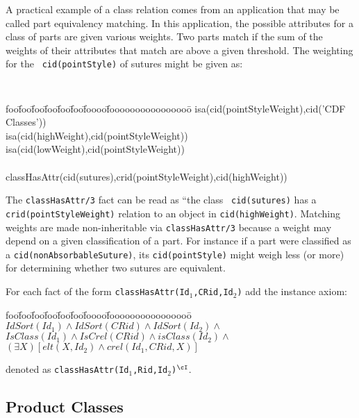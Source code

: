 \begin{example} \label{ex:strel} \rm 
A practical example of a class relation comes from an application that
may be called part equivalency matching.  In this application, the
possible attributes for a class of parts are given various weights.
Two parts match if the sum of the weights of their attributes that
match are above a given threshold.  The weighting for the {\tt
cid(pointStyle)} of sutures might be given as:
{\small 
{\tt 
\begin{tabbing}
foo\=foo\=foo\=foo\=foo\=foo\=foooo\=foooooooooooooooo\=\kill
\> isa(cid(pointStyleWeight),cid('CDF Classes')) \\
\> \> isa(cid(highWeight),cid(pointStyleWeight)) \\
\> \> isa(cid(lowWeight),cid(pointStyleWeight)) \\
\\
\> classHasAttr(cid(sutures),crid(pointStyleWeight),cid(highWeight))
\end{tabbing}
} }
\noindent
The {\tt classHasAttr/3} fact can be read as ``the class {\tt
cid(sutures)} has a {\tt crid(pointStyleWeight)} relation to an object
in {\tt cid(highWeight)}.  Matching weights are made non-inheritable
via {\tt classHasAttr/3} because a weight may depend on a given
classification of a part.  For instance if a part were classified as a
{\tt cid(nonAbsorbableSuture)}, its {\tt cid(pointStyle)} might weigh
less (or more) for determining whether two sutures are equivalent.
\end{example}
\begin{instance}  \rm 
For each fact of the form {\tt classHasAttr(Id$_1$,CRid,Id$_2$)} add the
instance axiom: 
\begin{tabbing}
foo\=foo\=foo\=foo\=foo\=foo\=foooo\=foooooooooooooooo\=\kill
\> $ IdSort(Id_1) \wedge IdSort(CRid) \wedge IdSort(Id_2) \wedge $ \\
\> \> $ IsClass(Id_1) \wedge IsCrel(CRid) \wedge isClass(Id_2) \wedge $ \\
\> \> \> $ (\exists X) [elt(X,Id_2) \wedge crel(Id_1,CRid,X)] $
\end{tabbing}
denoted as {\tt classHasAttr(Id$_1$,Rid,Id$_2$)$^{\cI}$}.
\end{instance}

\subsection{Product Classes}

